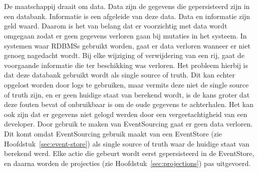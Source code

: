 


\chapter*{}

De maatschappij draait om data. Data zijn de gegevens die gepersisteerd zijn in een databank. Informatie is een afgeleide van deze data. Data en informatie zijn geld waard. Daarom is het van belang dat er voorzichtig met data wordt omgegaan zodat er geen gegevens verloren gaan bij mutaties in het systeem. In systemen waar \glspl{RDBMS} gebruikt worden, gaat er data verloren wanneer er niet genoeg nagedacht wordt. Bij elke wijziging of verwijdering van een rij, gaat de voorgaande informatie die ter beschikking was verloren. Het probleem hierbij is dat deze databank gebruikt wordt als single source of truth. Dit kan echter opgelost worden door \glspl{log} te gebruiken, maar vermits deze niet de single source of truth zijn, en er geen huidige staat van berekend wordt, is de kans groter dat deze fouten bevat of onbruikbaar is om de oude gegevens te achterhalen. Het kan ook zijn dat er gegevens niet gelogd werden door een vergeetachtigheid van een developer. Door gebruik te maken van EventSourcing gaat er geen data verloren. Dit komt omdat EventSourcing gebruik maakt van een EventStore (zie Hoofdstuk~\ref{sec:event-store}) als single source of truth waar de huidige staat van berekend werd. Elke actie die gebeurt wordt eerst gepersisteerd in de EventStore, en daarna worden de projecties (zie Hoofdstuk~\ref{sec:projections}) pas uitgevoerd.

